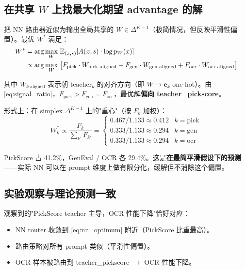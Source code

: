 \documentclass[11pt,a4paper]{article}
\newcommand{\E}{\mathbb{E}}
\begin{document}
\subsection{在共享 $W$ 上找最大化期望 advantage 的解}

把 NN 路由器近似为输出全局共享的 $W \in \Delta^{K-1}$（极简情况，但反映平滑性偏置）。最优 $W^*$ 满足：
\begin{align}
W^*
&= \arg\max_W \,\E_{(x, s)}[A(x, s) \cdot \log p_W(x)] \notag \\
&\propto \arg\max_W \;\bigl[
    F_{\text{pick}} \cdot W_{\text{pick-aligned}}
    + F_{\text{gen}} \cdot W_{\text{gen-aligned}}
    + F_{\text{ocr}} \cdot W_{\text{ocr-aligned}}
\bigr]
\end{align}

其中 $W_{k\text{-aligned}}$ 表示朝 $\text{teacher}_k$ 的对齐方向（即 $W \to \mathbf{e}_k$ one-hot）。由 \eqref{eq:signal_ratio}，$F_{\text{pick}} > F_{\text{gen}} = F_{\text{ocr}}$，最优解\textbf{偏向 teacher\_pickscore}。

形式上：在 simplex $\Delta^{K-1}$ 上的"重心"（按 $F_k$ 加权）：
\begin{equation}
W^*_k \propto \frac{F_k}{\sum_{k'} F_{k'}} = \begin{cases}
    0.467 / 1.133 \approx 0.412 & k = \text{pick} \\
    0.333 / 1.133 \approx 0.294 & k = \text{gen} \\
    0.333 / 1.133 \approx 0.294 & k = \text{ocr}
\end{cases}
\label{eq:nn_optimum}
\end{equation}

PickScore 占 41.2\%，GenEval / OCR 各 29.4\%。这是\textbf{在最简平滑假设下的预测}——实际 NN 可以在 prompt 维度上做有限分化，缓解但不消除这个偏置。

\subsection{实验观察与理论预测一致}

观察到的"PickScore teacher 主导，OCR 性能下降"恰好对应：
\begin{itemize}
    \item NN router 收敛到 \eqref{eq:nn_optimum} 附近（PickScore 比重最高）。
    \item 路由策略对所有 prompt 类似（平滑性偏置）。
    \item OCR 样本被路由到 teacher\_pickscore $\to$ OCR 性能下降。
\end{itemize}
\end{document}
